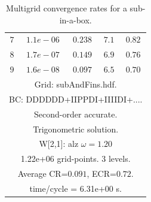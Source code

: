 \begin{table}[hbt]
\begin{center}
{\begin{tabular}{|c|c|c|c|c|}
 $ 7$  & $ 1.1e-06$ & $0.238$ & $ 7.1$ & $0.82$ \\ 
 $ 8$  & $ 1.7e-07$ & $0.149$ & $ 6.9$ & $0.76$ \\ 
 $ 9$  & $ 1.6e-08$ & $0.097$ & $ 6.5$ & $0.70$ \\ 
\hline 
\multicolumn{5}{|c|}{Grid: subAndFins.hdf.}  \\
\multicolumn{5}{|c|}{BC: DDDDDD+IIPPDI+IIIIDI+....}  \\
\multicolumn{5}{|c|}{Second-order accurate.}  \\
\multicolumn{5}{|c|}{Trigonometric solution.}  \\
\multicolumn{5}{|c|}{W[2,1]: alz $\omega=1.20$}  \\
\multicolumn{5}{|c|}{1.22e+06 grid-points. 3 levels.}  \\
\multicolumn{5}{|c|}{Average CR=$0.091$, ECR=$0.72$.}  \\
\multicolumn{5}{|c|}{time/cycle = 6.31e+00 s.}  \\
\hline 
\end{tabular}
} %
\end{center}
\caption{Multigrid convergence rates for a sub-in-a-box.}
\label{fig:subInABoxI}
\end{table}



